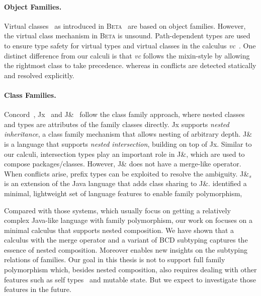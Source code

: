 \paragraph{Object Families.}

Virtual classes~\citep{Madsen_1989} as introduced in
\textsc{Beta}~\citep{LehrmannMadsen:1993:OPB:221048} are based on object
families. However, the virtual class mechanism in \textsc{Beta} is unsound.
Path-dependent types are used to ensure type safety for virtual types and
virtual classes in the calculus \textit{vc}~\citep{ErnstVirtual}. One distinct
difference from our calculi is that \textit{vc} follows the mixin-style by
allowing the rightmost class to take precedence. whereas in \namee conflicts are
detected statically and resolved explicitly.

\paragraph{Class Families.}

Concord~\citep{jolly2004simple}, Jx~\citep{Nystrom_2004} and
J\&~\citep{Nystrom:2006} follow the class family approach, where nested classes
and types are attributes of the family classes directly.
Jx supports \textit{nested inheritance}, a class family mechanism that allows
nesting of arbitrary depth. J\& is a language that supports \textit{nested
  intersection}, building on top of Jx. Similar to our calculi, intersection
types play an important role in J\&, which are used to compose packages/classes.
However, J\& does not have a merge-like operator. When conflicts arise, prefix
types can be exploited to resolve the ambiguity. J\&$_s$~\citep{Qi:2009} is an
extension of the Java language that adds class sharing to J\&.
\citet{SAITO_2007} identified a minimal, lightweight set of language features to
enable family polymorphism,

Compared with those systems, which usually focus on getting a relatively complex
Java-like language with family polymorphism, our work on \namee focuses on a
minimal calculus that supports nested composition. We have shown that a calculus
with the merge operator and a variant of BCD subtyping captures the essence of nested
composition. Moreover \namee enables new insights on the subtyping relations of
families. Our goal in this thesis is not to support full family polymorphism
which, besides nested composition, also requires dealing with other features
such as self types~\citep{bruce95thistype,saito09matching} and mutable state.
But we expect to investigate those features in the future.


